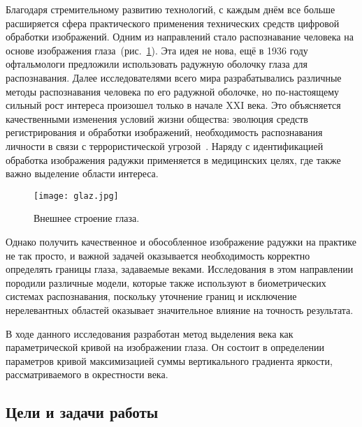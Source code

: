 \documentclass[12pt,a4paper]{article} %
\begin{document}
Благодаря стремительному развитию технологий, с каждым днём все больше расширяется сфера практического применения технических средств цифровой обработки изображений. Одним из направлений стало распознавание человека на основе изображения глаза~(рис.~\ref{fig:glaz}). Эта идея не нова, ещё в 1936 году офтальмологи \cite{Medic} предложили использовать радужную оболочку глаза для распознавания. Далее исследователями всего мира разрабатывались различные методы распознавания человека по его радужной оболочке, но по-настоящему сильный рост интереса произошел только в начале XXI века. Это объясняется качественными изменения условий жизни общества: эволюция средств регистрирования и обработки изображений, необходимость распознавания личности в связи с террористической угрозой~\cite{Conf3, Terr, Tech}. Наряду с идентификацией обработка изображения радужки применяется в медицинских целях, где также важно выделение области интереса. 

\begin{figure}[h]
	
	\centering
	
	\texttt{[image: glaz.jpg]}
	
	\caption{Внешнее строение глаза.}
	
	\label{fig:glaz}
	
\end{figure}

Однако получить качественное и обособленное изображение радужки на практике не так просто, и важной задачей оказывается необходимость корректно определять границы глаза, задаваемые веками. Исследования в этом направлении породили различные модели, которые также используют в биометрических системах распознавания, поскольку уточнение границ и исключение нерелевантных областей оказывает значительное влияние на точность результата.

В ходе данного исследования разработан метод выделения века как параметрической кривой на изображении глаза. Он состоит в определении параметров кривой максимизацией суммы вертикального градиента яркости, рассматриваемого в окрестности века.
 

\newpage
\subsection{Цели и задачи работы}
\end{document}
